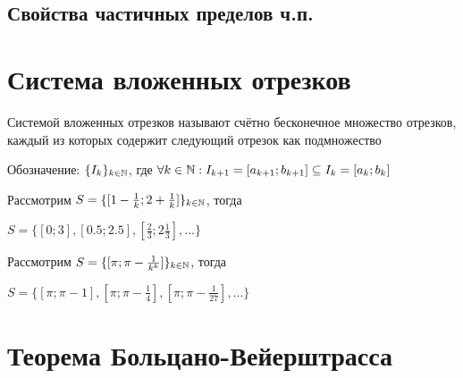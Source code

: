 \subsection{Свойства частичных пределов ч.п.}


\section{Система вложенных отрезков}

{
    Системой вложенных отрезков называют счётно бесконечное множество отрезков, каждый из которых содержит
    следующий отрезок как подмножество

    Обозначение: $ \{ I_k \}_{k \in \Nset} $, где $ \forall k \in \Nset: I_{k+1} = [a_{k + 1}; b_{k + 1}] \subseteq I_{k} = [a_k; b_k] $
}

\mcex{}
{
    Рассмотрим $ S = \{ [1 - \frac{1}{k}; 2 + \frac{1}{k}] \}_{k \in \Nset} $, тогда

    $ S = \{ [0; 3], [0.5; 2.5], [\frac{2}{3}; 2\frac{1}{3}], ... \} $

    Рассмотрим $ S = \{ [\pi; \pi - \frac{1}{k^k}] \}_{k \in \Nset} $, тогда

    $ S = \{ [\pi; \pi - 1], [\pi; \pi - \frac{1}{4}], [\pi; \pi - \frac{1}{27}], ... \} $
}

\section{Теорема Больцано-Вейерштрасса}

